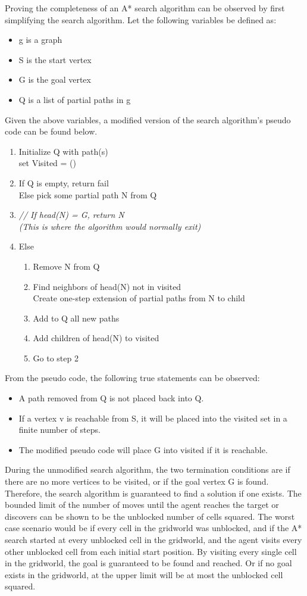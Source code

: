 \documentclass[12pt]{article}
\begin{document}
		Proving the completeness of an A* search algorithm can be observed by first simplifying the search algorithm.  Let the following variables be defined as: 
		\begin{itemize}
			\item g is a graph
			\item S is the start vertex
			\item G is the goal vertex
			\item Q is a list of partial paths in g
		\end{itemize}
		Given the above variables, a modified version of the search algorithm's pseudo code can be found below.
		\begin{enumerate}
			\item Initialize Q with path(s)\\
			set Visited = ()
			\item If Q is empty, return fail\\
			Else pick some partial path N from Q
			\item \textit{// If head(N) = G, return N \\ (This is where the algorithm would normally exit)}
			\item Else
			\begin{enumerate}
				\item Remove N from Q
				\item Find neighbors of head(N) not in visited\\
				Create one-step extension of partial paths from N to child
				\item Add to Q all new paths
				\item Add children of head(N) to visited
				\item Go to step 2
			\end{enumerate}
		\end{enumerate}
	
		From the pseudo code, the following true statements can be observed:
		\begin{itemize}
			\item A path removed from Q is not placed back into Q.
			\item If a vertex v is reachable from S, it will be placed into the visited set in a finite number of steps.
			\item The modified pseudo code will place G into visited if it is reachable.
		\end{itemize}
		During the unmodified search algorithm, the two termination conditions are if there are no more vertices to be visited, or if the goal vertex G is found.  Therefore, the search algorithm is guaranteed to find a solution if one exists.  
		The bounded limit of the number of moves until the agent reaches the target or discovers can be shown to be the unblocked number of cells squared.  The worst case scenario would be if every cell in the gridworld was unblocked, and if the A* search started at every unblocked cell in the gridworld, and the agent visits every other unblocked cell from each initial start position.  By visiting every single cell in the gridworld, the goal is guaranteed to be found and reached.  Or if no goal exists in the gridworld, at the upper limit will be at most the unblocked cell squared.    
\end{document}
